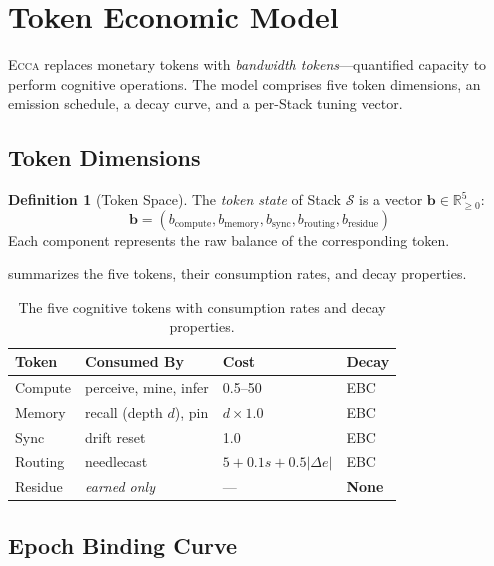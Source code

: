 \documentclass[11pt,twocolumn]{article}
\theoremstyle{definition}
\newtheorem{definition}{Definition}[section]
\theoremstyle{plain}
\theoremstyle{remark}
\newcommand{\ecca}{\textsc{Ecca}}
\newcommand{\R}{\mathbb{R}}
\begin{document}
\section{Token Economic Model}\label{sec:tokens}

\ecca{} replaces monetary tokens with \emph{bandwidth tokens}---quantified capacity to perform cognitive operations. The model comprises five token dimensions, an emission schedule, a decay curve, and a per-Stack tuning vector.

\subsection{Token Dimensions}

\begin{definition}[Token Space]\label{def:token-space}
The \emph{token state} of Stack $\mathcal{S}$ is a vector $\mathbf{b} \in \R_{\geq 0}^5$:
\begin{equation}
  \mathbf{b} = (b_{\mathrm{compute}}, b_{\mathrm{memory}}, b_{\mathrm{sync}}, b_{\mathrm{routing}}, b_{\mathrm{residue}})
\end{equation}
Each component represents the raw balance of the corresponding token.
\end{definition}

 summarizes the five tokens, their consumption rates, and decay properties.

\begin{table}[t]
\centering
\caption{The five cognitive tokens with consumption rates and decay properties.}
\label{tab:tokens}
\small
\begin{tabular}{@{}lp{2.8cm}ll@{}}
\toprule
\textbf{Token} & \textbf{Consumed By} & \textbf{Cost} & \textbf{Decay}\\
\midrule
Compute & perceive, mine, infer & 0.5--50 & EBC\\
Memory & recall (depth $d$), pin & $d \times 1.0$ & EBC\\
Sync & drift reset & 1.0 & EBC\\
Routing & needlecast & $5 + 0.1s + 0.5|\Delta e|$ & EBC\\
Residue & \textit{earned only} & --- & \textbf{None}\\
\bottomrule
\end{tabular}
\end{table}

\subsection{Epoch Binding Curve}
\end{document}
